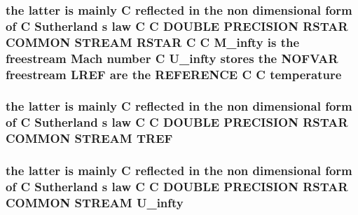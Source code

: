 \hypertarget{home_2abonfi_2_c_f_d__codes_2_eul_f_s_83_84_2include_2stream_8com_a46fb926ed83966d981ba4bbfd791eaed}{
\subsubsection[{temperature}]{\setlength{\rightskip}{0pt plus 5cm}the latter is mainly C reflected in the non dimensional form of C Sutherland s law C C D\-O\-U\-B\-L\-E P\-R\-E\-C\-I\-S\-I\-O\-N R\-S\-T\-A\-R C\-O\-M\-M\-O\-N S\-T\-R\-E\-A\-M R\-S\-T\-A\-R C C {\bf M\-\_\-infty} is the freestream Mach number C {\bf U\-\_\-infty} stores the N\-O\-F\-V\-A\-R freestream {\bf L\-R\-E\-F} {\bf are} the R\-E\-F\-E\-R\-E\-N\-C\-E C C temperature}}\label{home_2abonfi_2_c_f_d__codes_2_eul_f_s_83_84_2include_2stream_8com_a46fb926ed83966d981ba4bbfd791eaed}
\hypertarget{home_2abonfi_2_c_f_d__codes_2_eul_f_s_83_84_2include_2stream_8com_a8c4a60ca1b033fbd4e2cadaf15146ca5}{
\subsubsection[{T\-R\-E\-F}]{\setlength{\rightskip}{0pt plus 5cm}the latter is mainly C reflected in the non dimensional form of C Sutherland s law C C D\-O\-U\-B\-L\-E P\-R\-E\-C\-I\-S\-I\-O\-N R\-S\-T\-A\-R C\-O\-M\-M\-O\-N S\-T\-R\-E\-A\-M T\-R\-E\-F}}\label{home_2abonfi_2_c_f_d__codes_2_eul_f_s_83_84_2include_2stream_8com_a8c4a60ca1b033fbd4e2cadaf15146ca5}
\hypertarget{home_2abonfi_2_c_f_d__codes_2_eul_f_s_83_84_2include_2stream_8com_a396c12357ce60c0aaccd169e136b5d9a}{
\subsubsection[{U\-\_\-infty}]{\setlength{\rightskip}{0pt plus 5cm}the latter is mainly C reflected in the non dimensional form of C Sutherland s law C C D\-O\-U\-B\-L\-E P\-R\-E\-C\-I\-S\-I\-O\-N R\-S\-T\-A\-R C\-O\-M\-M\-O\-N S\-T\-R\-E\-A\-M U\-\_\-infty}}\label{home_2abonfi_2_c_f_d__codes_2_eul_f_s_83_84_2include_2stream_8com_a396c12357ce60c0aaccd169e136b5d9a}
